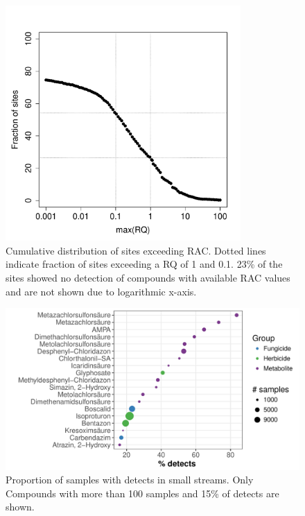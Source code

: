 \begin{figure}[ht]
	\centering
	\includegraphics[width = 0.8\textwidth]{appendix/smallstreams/one/prac_ex}
	\caption[Cumulative distribution of the number sites exceeding RAC.]{Cumulative distribution of sites exceeding RAC. Dotted lines indicate fraction of sites exceeding a RQ of 1 and 0.1. 23\% of the sites showed no detection of compounds with available RAC values and are not shown due to logarithmic x-axis.}
	\label{fig:prac_ex}
\end{figure}


\begin{landscape}
\begin{figure}[ht]
	\centering
	\includegraphics[width = 0.8\textheight]{appendix/smallstreams/one/pdetects}
	\caption[Proportion of samples with detects in small streams.]{Proportion of samples with detects in small streams. Only Compounds with more than 100 samples and 15\% of detects are shown.}
	\label{fig:pdetects}
\end{figure}
\end{landscape}

